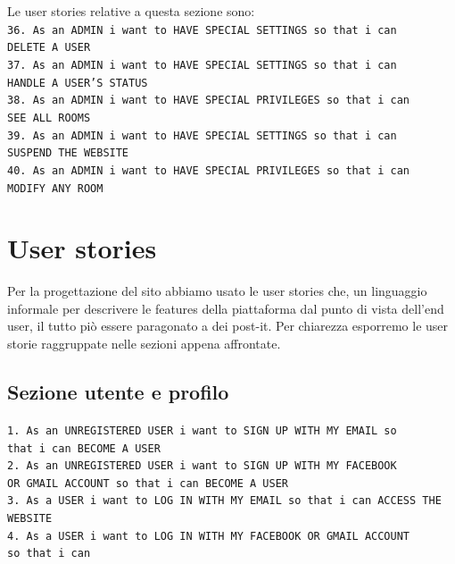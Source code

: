 	Le user stories relative a questa sezione sono:\\
	\texttt{36. As an ADMIN i want to HAVE SPECIAL SETTINGS so that i can \\ DELETE A USER}\\
	\texttt{37. As an ADMIN i want to HAVE SPECIAL SETTINGS so that i can \\ HANDLE A USER’S STATUS}\\
	\texttt{38. As an ADMIN i want to HAVE SPECIAL PRIVILEGES so that i can \\ SEE ALL ROOMS}\\
	\texttt{39. As an ADMIN i want to HAVE SPECIAL SETTINGS so that i can \\ SUSPEND THE WEBSITE}\\
	\texttt{40. As an ADMIN i want to HAVE SPECIAL PRIVILEGES so that i can \\ MODIFY ANY ROOM}\\
	
	\section{User stories}
	Per la progettazione del sito abbiamo usato le user stories che, un linguaggio informale per descrivere le features della piattaforma dal punto di vista dell'end user, il tutto piò essere paragonato a dei post-it. Per chiarezza esporremo le user storie raggruppate nelle sezioni appena affrontate.
	
	\subsection{Sezione utente e profilo}
	\texttt{1. As an UNREGISTERED USER i want to SIGN UP WITH MY EMAIL so \\ that i can BECOME A USER}\\
	\texttt{2. As an UNREGISTERED USER i want to SIGN UP WITH MY FACEBOOK \\ OR GMAIL ACCOUNT so that i can BECOME A USER}\\
	\texttt{3. As a USER i want to LOG IN WITH MY EMAIL so that i can ACCESS THE WEBSITE}\\
	\texttt{4. As a USER i want to LOG IN WITH MY FACEBOOK OR GMAIL ACCOUNT \\so that i can}\\
	
